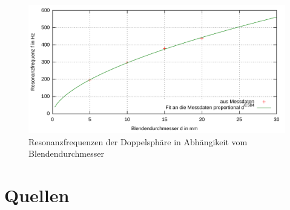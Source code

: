 \documentclass[numbers=noenddot,12pt,a4paper]{scrartcl}
\begin{document}
\begin{figure}[H]
	\centering
	\includegraphics[width=\textwidth]{messwerte/resonanzendoppelsphre.pdf}
	\caption{Resonanzfrequenzen der Doppelsphäre in Abhängikeit vom Blendendurchmesser}\label{img:reskopp}
\end{figure}
\section{Quellen}
\end{document}

